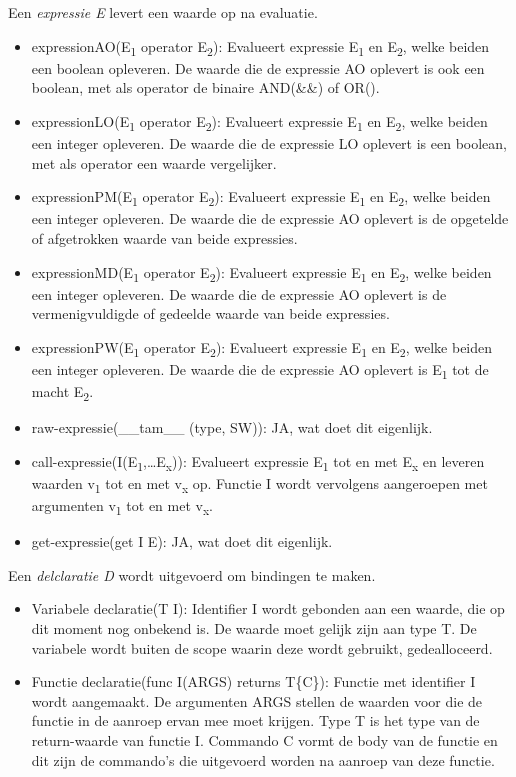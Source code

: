 Een \emph{expressie E} levert een waarde op na evaluatie.
\begin{itemize}
    \item expressionAO(E\textsubscript{1} operator E\textsubscript{2}): Evalueert expressie E\textsubscript{1} en E\textsubscript{2}, welke beiden een boolean opleveren. De waarde die de expressie AO oplevert is ook een boolean, met als operator de binaire AND(\&\&) of OR(\textbar\textbar).
    \item expressionLO(E\textsubscript{1} operator E\textsubscript{2}): Evalueert expressie E\textsubscript{1} en E\textsubscript{2}, welke beiden een integer opleveren. De waarde die de expressie LO oplevert is een boolean, met als operator een waarde vergelijker.
    \item expressionPM(E\textsubscript{1} operator E\textsubscript{2}): Evalueert expressie E\textsubscript{1} en E\textsubscript{2}, welke beiden een integer opleveren. De waarde die de expressie AO oplevert is de opgetelde of afgetrokken waarde van beide expressies.
    \item expressionMD(E\textsubscript{1} operator E\textsubscript{2}): Evalueert expressie E\textsubscript{1} en E\textsubscript{2}, welke beiden een integer opleveren. De waarde die de expressie AO oplevert is de vermenigvuldigde of gedeelde waarde van beide expressies.
    \item expressionPW(E\textsubscript{1} operator E\textsubscript{2}): Evalueert expressie E\textsubscript{1} en E\textsubscript{2}, welke beiden een integer opleveren. De waarde die de expressie AO oplevert is E\textsubscript{1} tot de macht E\textsubscript{2}.
    \item raw-expressie(\_\_tam\_\_ (type, SW)): JA, wat doet dit eigenlijk.
    \item call-expressie(I(E\textsubscript{1},\dots E\textsubscript{x})): Evalueert expressie E\textsubscript{1} tot en met E\textsubscript{x} en leveren waarden v\textsubscript{1} tot en met v\textsubscript{x} op. Functie I wordt vervolgens aangeroepen met argumenten v\textsubscript{1} tot en met v\textsubscript{x}.
    \item get-expressie(get I E): JA, wat doet dit eigenlijk.
\end{itemize}

Een \emph{delclaratie D} wordt uitgevoerd om bindingen te maken. 
\begin{itemize}
    \item Variabele declaratie(T I): Identifier I wordt gebonden aan een waarde, die op dit moment nog onbekend is. De waarde moet gelijk zijn aan type T. De variabele wordt buiten de scope waarin deze wordt gebruikt, gedealloceerd.
    \item Functie declaratie(func I(ARGS) returns T\{C\}): Functie met identifier I wordt aangemaakt. De argumenten ARGS stellen de waarden voor die de functie in de aanroep ervan mee moet krijgen. Type T is het type van de return-waarde van functie I. Commando C vormt de body van de functie en dit zijn de commando's die uitgevoerd worden na aanroep van deze functie.
\end{itemize}


\clearpage